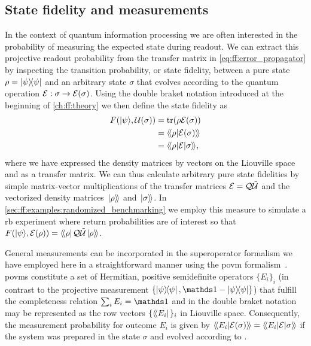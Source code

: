 \subsection{State fidelity and measurements}\label{sec:ff:theory:derived_quantities:state_fidelity-measurements}
In the context of quantum information processing we are often interested in the probability of measuring the expected state during readout.
We can extract this projective readout probability from the transfer matrix in \cref{eq:ff:error_propagator} by inspecting the transition probability, or state fidelity, between a pure state $\rho = \op{\psi}$ and an arbitrary state $\sigma$ that evolves according to the quantum operation $\mathcal{E}: \sigma\rightarrow\mathcal{E}(\sigma)$.
Using the double braket notation introduced at the beginning of \cref{ch:ff:theory} we then define the state fidelity as
\begin{equation}\label{eq:ff:fidelity:state}
\begin{split}
    \fid(\kpsi, \liouvU(\sigma)) &= \tr(\rho\qp(\sigma)) \\
                               &= \dip{\rho}{\qp(\sigma)} \\
                               & =  \dmel{\rho}{\qp}{\sigma},
\end{split}
\end{equation}
where we have expressed the density matrices by vectors on the Liouville space \Lspace and \qp as a transfer matrix.
We can thus calculate arbitrary pure state fidelities by simple matrix-vector multiplications of the transfer matrices $\mathcal{E} = \mathcal{Q}\mathcal{\tilde{U}}$ and the vectorized density matrices $\mbox{\ensuremath{\left.\ket{\rho}\!\right\rangle}}$ and $\mbox{\ensuremath{\left.\ket{\sigma}\!\right\rangle}}$.
In \cref{sec:ff:examples:randomized_benchmarking} we employ this measure to simulate a \gls{rb} experiment where return probabilities are of interest so that $F(\mbox{\ensuremath{\ket{\psi}}}, \mathcal{E}(\rho)) = \mbox{\ensuremath{\left\langle\!\bra{\rho}\right.}}\mathcal{Q}\mathcal{\tilde{U}}\mbox{\ensuremath{\left.\ket{\rho}\!\right\rangle}}$.

General measurements can be incorporated in the superoperator formalism we have employed here in a straightforward manner using the \gls{povm} formalism~\cite{Wallman2014,Greenbaum2015}.
\Glspl{povm} constitute a set of Hermitian, positive semidefinite operators $\lbrace E_i\rbrace_i$ (in contrast to the projective measurement $\lbrace\op{\psi}{\psi},\eye - \op{\psi}{\psi}\rbrace$) that fulfill the completeness relation $\sum_i E_i = \eye$ and in the double braket notation may be represented as the row vectors $\lbrace\mbox{\ensuremath{\left\langle\!\bra{E_i}\right.}}\rbrace_i$ in Liouville space.
Consequently, the measurement probability for outcome $E_i$ is given by $\dip{E_i}{\qp(\sigma)} = \dmel{E_i}{\qp}{\sigma}$ if the system was prepared in the state $\sigma$ and evolved according to \qp.

